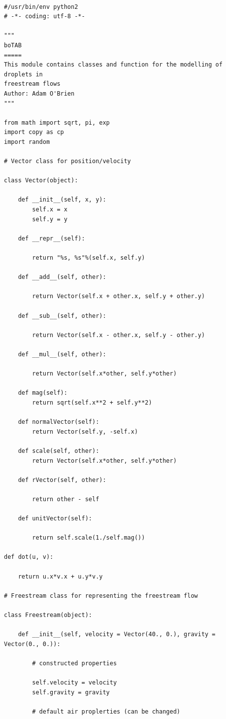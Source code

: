 \documentclass[12pt]{article}
\begin{document}
\begin{lstlisting}

#/usr/bin/env python2
# -*- coding: utf-8 -*-

"""
boTAB
=====
This module contains classes and function for the modelling of droplets in
freestream flows
Author: Adam O'Brien
"""

from math import sqrt, pi, exp
import copy as cp
import random

# Vector class for position/velocity

class Vector(object):

    def __init__(self, x, y):
        self.x = x
        self.y = y

    def __repr__(self):

        return "%s, %s"%(self.x, self.y)

    def __add__(self, other):

        return Vector(self.x + other.x, self.y + other.y)

    def __sub__(self, other):

        return Vector(self.x - other.x, self.y - other.y)

    def __mul__(self, other):

        return Vector(self.x*other, self.y*other)

    def mag(self):
        return sqrt(self.x**2 + self.y**2)

    def normalVector(self):
        return Vector(self.y, -self.x)

    def scale(self, other):
        return Vector(self.x*other, self.y*other)

    def rVector(self, other):

        return other - self

    def unitVector(self):

        return self.scale(1./self.mag())

def dot(u, v):

    return u.x*v.x + u.y*v.y

# Freestream class for representing the freestream flow

class Freestream(object):

    def __init__(self, velocity = Vector(40., 0.), gravity = Vector(0., 0.)):

        # constructed properties

        self.velocity = velocity
        self.gravity = gravity

        # default air proplerties (can be changed)


\end{lstlisting}
\end{document}
